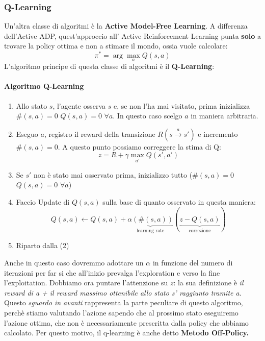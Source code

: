 \subsubsection{Q-Learning}
Un'altra classe di algoritmi è la \textbf{Active Model-Free Learning}. A differenza dell'Active ADP, quest'approccio all' Active Reinforcement Learning punta \textbf{solo} a trovare la policy ottima e 
non a stimare il mondo, ossia vuole calcolare:
\begin{equation}
    \pi^* = \arg \max_a Q(s,a)
\end{equation}
L'algoritmo principe di questa classe di algoritmi è il \textbf{Q-Learning}:
\paragraph{Algoritmo Q-Learning}
\begin{enumerate}
    \item Allo stato $s$, l'agente osserva $s$ e, se non l'ha mai visitato, prima inizializza $\#(s,a) = 0$  $ Q(s,a) = 0$  $ \forall a$. In questo caso
    scelgo $a$ in maniera arbitraria.
    \item Eseguo $a$, registro il reward della transizione $R(s \xrightarrow{a} s')$ e incremento $\#(s,a) = 0$. A questo punto possiamo correggere la stima 
          di Q:
          \begin{equation} \label{eq: stimaQ}
            z = R + \gamma \max_{a'}Q(s',a')
          \end{equation}
    \item Se $s'$ non è stato mai osservato prima, inizializzo tutto ($\#(s,a) = 0$  $ Q(s,a) = 0$  $ \forall a$)
    \item Faccio Update di $Q(s,a)$ sulla base di quanto osservato in questa maniera:
          \begin{equation}
            Q(s,a) \leftarrow Q(s,a) + \underbrace{\alpha(\#(s,a))}_{\text{learning rate}}(\underbrace{z - Q(s,a)}_{\text{correzione}})
          \end{equation}
    \item Riparto dalla (2)
\end{enumerate}
Anche in questo caso dovremmo adottare un $\alpha$ in funzione del numero di iterazioni per far si che all'inizio prevalga l'exploration
e verso la fine l'exploitation. Dobbiamo ora puntare l'attenzione su $z$: la sua definizione è \textit{il reward di a + 
il reward massimo ottenibile allo stato s' raggiunto tramite a}. Questo \textit{sguardo in avanti} rappresenta la parte peculiare
di questo algoritmo, perchè stiamo valutando l'azione sapendo che al prossimo stato eseguiremo l'azione ottima, che non è necessariamente
prescritta dalla policy che abbiamo calcolato. Per questo motivo, il q-learning è anche detto \textbf{Metodo Off-Policy.}

